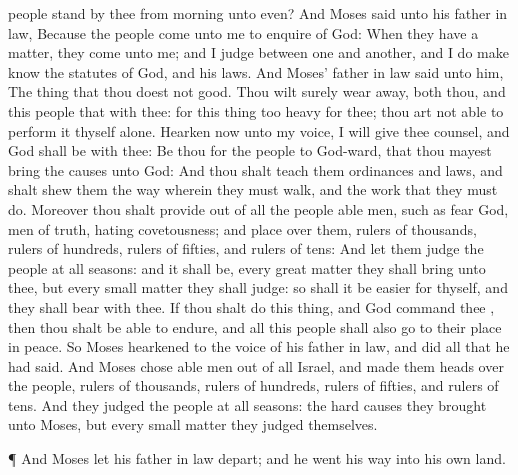 {people
stand by thee from
morning unto
even?
And
Moses
said unto his father in
law, Because the
people
come unto me to
enquire of
God:
When they have a
matter, they
come unto me; and I
judge between
one and
another, and I do make
{}
know the
statutes of
God, and his
laws.
And
Moses’ father in
law
said unto him, The
thing that thou
doest
{} not
good.
Thou wilt
surely wear
away, both thou, and this
people that
{} with thee: for this
thing
{} too
heavy for thee; thou art not
able to
perform it thyself alone.
Hearken now unto my
voice, I will give thee
counsel, and
God shall
be with thee: Be thou for the
people to
God-ward, that thou mayest
bring the
causes unto
God:
And thou shalt
teach them
ordinances and
laws, and shalt
shew them the
way wherein they must
walk, and the
work that they must
do.
Moreover thou shalt
provide out of all the
people
able
men, such as
fear
God,
men of
truth,
hating
covetousness; and
place
{} over them,
{}
rulers of
thousands,
{}
rulers of
hundreds,
rulers of
fifties, and
rulers of
tens:
And let them
judge the
people at all
seasons: and it shall be,
{} every
great
matter they shall
bring unto thee, but every
small
matter they shall
judge: so shall it be
easier for thyself, and they shall
bear
{} with thee.
If thou shalt
do this
thing, and
God
command thee
{}, then thou shalt be
able to
endure, and all this
people shall also
go to their
place in
peace.
So
Moses
hearkened to the
voice of his father in
law, and
did all that he had
said.
And
Moses
chose
able
men out of all
Israel, and
made them
heads over the
people,
rulers of
thousands,
rulers of
hundreds,
rulers of
fifties, and
rulers of
tens.
And they
judged the
people at all
seasons: the
hard
causes they
brought unto
Moses, but every
small
matter they
judged themselves.
\par }{\PP {}¶ And
Moses let his father in
law
depart; and he
went his way into his own
land.

}
